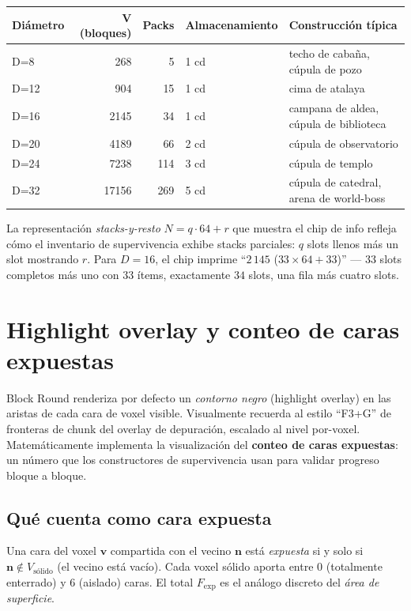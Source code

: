 \documentclass[12pt,a4paper]{scrartcl}
\newcommand{\acc}[1]{\textcolor{accent}{\textbf{#1}}}
\begin{document}
\vspace{0.4em}
\begin{center}
\small
\begin{tabularx}{\textwidth}{@{}lrrlX@{}}
\toprule
\textbf{Diámetro} & \textbf{V (bloques)} & \textbf{Packs} & \textbf{Almacenamiento} & \textbf{Construcción típica} \\
\midrule
D=8   &   268 &  5  &  1 cd & techo de cabaña, cúpula de pozo  \\
D=12  &   904 & 15  &  1 cd & cima de atalaya \\
D=16  &  2145 & 34  &  1 cd & campana de aldea, cúpula de biblioteca \\
D=20  &  4189 & 66  &  2 cd & cúpula de observatorio \\
D=24  &  7238 & 114 &  3 cd & cúpula de templo \\
D=32  & 17156 & 269 &  5 cd & cúpula de catedral, arena de world-boss \\
\bottomrule
\end{tabularx}
\end{center}

La representación \emph{stacks-y-resto} $N = q \cdot 64 + r$ que muestra el chip de info refleja cómo el inventario de supervivencia exhibe stacks parciales: $q$ slots llenos más un slot mostrando $r$. Para $D=16$, el chip imprime \enquote{$2\,145$ ($33 \times 64 + 33$)} --- $33$ slots completos más uno con $33$ ítems, exactamente $34$ slots, una fila más cuatro slots.

\section{Highlight overlay y conteo de caras expuestas}

Block Round renderiza por defecto un \emph{contorno negro} (highlight overlay) en las aristas de cada cara de voxel visible. Visualmente recuerda al estilo \enquote{F3+G} de fronteras de chunk del overlay de depuración, escalado al nivel por-voxel. Matemáticamente implementa la visualización del \acc{conteo de caras expuestas}: un número que los constructores de supervivencia usan para validar progreso bloque a bloque.

\subsection{Qué cuenta como cara expuesta}
Una cara del voxel $\mathbf{v}$ compartida con el vecino $\mathbf{n}$ está \emph{expuesta} si y solo si $\mathbf{n} \notin V_{\mathrm{sólido}}$ (el vecino está vacío). Cada voxel sólido aporta entre $0$ (totalmente enterrado) y $6$ (aislado) caras. El total $F_{\mathrm{exp}}$ es el análogo discreto del \emph{área de superficie}.
\end{document}
